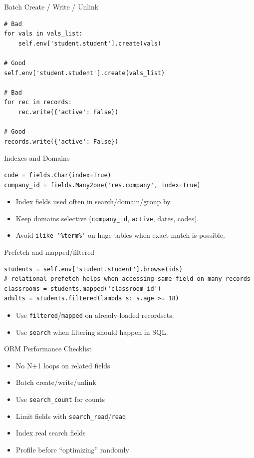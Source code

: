 \begin{frame}[fragile]{Batch Create / Write / Unlink}
\begin{lstlisting}
# Bad
for vals in vals_list:
	self.env['student.student'].create(vals)

# Good
self.env['student.student'].create(vals_list)

# Bad
for rec in records:
	rec.write({'active': False})

# Good
records.write({'active': False})
\end{lstlisting}
\end{frame}

\begin{frame}[fragile]{Indexes and Domains}
\begin{lstlisting}
code = fields.Char(index=True)
company_id = fields.Many2one('res.company', index=True)
\end{lstlisting}
	\begin{itemize}
		\item Index fields used often in search/domain/group by.
		\item Keep domains selective (\texttt{company\_id}, \texttt{active}, dates, codes).
		\item Avoid \texttt{ilike '\%term\%'} on huge tables when exact match is possible.
	\end{itemize}
\end{frame}

\begin{frame}[fragile]{Prefetch and mapped/filtered}
\begin{lstlisting}
students = self.env['student.student'].browse(ids)
# relational prefetch helps when accessing same field on many records
classrooms = students.mapped('classroom_id')
adults = students.filtered(lambda s: s.age >= 18)
\end{lstlisting}
	\begin{itemize}
		\item Use \texttt{filtered}/\texttt{mapped} on already-loaded recordsets.
		\item Use \texttt{search} when filtering should happen in SQL.
	\end{itemize}
\end{frame}

\begin{frame}{ORM Performance Checklist}
	\begin{itemize}
		\item No N+1 loops on related fields
		\item Batch create/write/unlink
		\item Use \texttt{search\_count} for counts
		\item Limit fields with \texttt{search\_read}/\texttt{read}
		\item Index real search fields
		\item Profile before ``optimizing'' randomly
	\end{itemize}
\end{frame}
